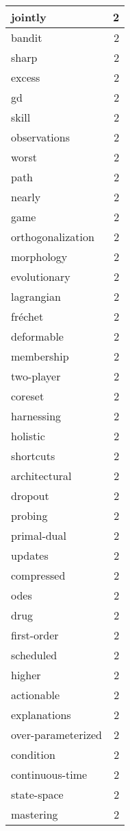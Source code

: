 \begin{table}[h]
\begin{tabular}{|l|r|}
\hline
jointly & 2 \\
\hline
bandit & 2 \\
\hline
sharp & 2 \\
\hline
excess & 2 \\
\hline
gd & 2 \\
\hline
skill & 2 \\
\hline
observations & 2 \\
\hline
worst & 2 \\
\hline
path & 2 \\
\hline
nearly & 2 \\
\hline
game & 2 \\
\hline
orthogonalization & 2 \\
\hline
morphology & 2 \\
\hline
evolutionary & 2 \\
\hline
lagrangian & 2 \\
\hline
fréchet & 2 \\
\hline
deformable & 2 \\
\hline
membership & 2 \\
\hline
two-player & 2 \\
\hline
coreset & 2 \\
\hline
harnessing & 2 \\
\hline
holistic & 2 \\
\hline
shortcuts & 2 \\
\hline
architectural & 2 \\
\hline
dropout & 2 \\
\hline
probing & 2 \\
\hline
primal-dual & 2 \\
\hline
updates & 2 \\
\hline
compressed & 2 \\
\hline
odes & 2 \\
\hline
drug & 2 \\
\hline
first-order & 2 \\
\hline
scheduled & 2 \\
\hline
higher & 2 \\
\hline
actionable & 2 \\
\hline
explanations & 2 \\
\hline
over-parameterized & 2 \\
\hline
condition & 2 \\
\hline
continuous-time & 2 \\
\hline
state-space & 2 \\
\hline
mastering & 2 \\

\end{tabular}
\end{table}
